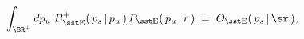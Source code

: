 \begin{equation}
\int_{\BR^+}dp_u \;B_{\rm\sst E}^{+}(\,p_s\,|\,p_u\,)\,P_{\rm\sst E}
(\,p_u\,|\,r\,)\;
=\; O_{\rm\sst E}(\,p_s\,|\,\sr\,),
\end{equation}

